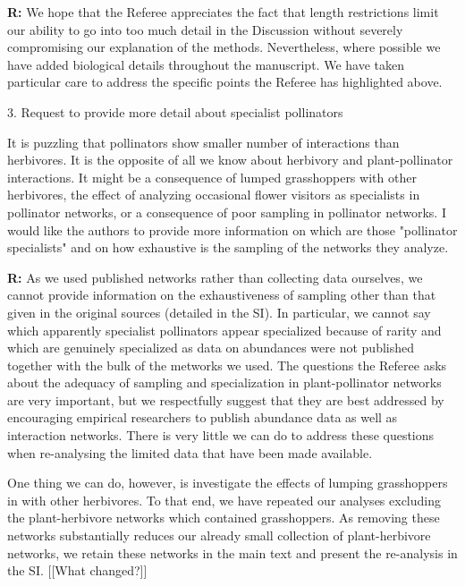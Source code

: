 \documentclass[12pt]{letter}
\newenvironment{refquote}{\bigskip \begin{it}}{\end{it}\smallskip}
\begin{document}
    \textbf{R:} We hope that the Referee appreciates the fact that length restrictions limit our ability to go into too much detail in the Discussion without severely compromising our explanation of the methods. Nevertheless, where possible we have added biological details throughout the manuscript. We have taken particular care to address the specific points the Referee has highlighted above.


  3. Request to provide more detail about specialist pollinators

    \begin{refquote}

      It is puzzling that pollinators show smaller number of interactions than herbivores. It is the opposite of all we know about herbivory and plant-pollinator interactions. It might be a consequence of lumped grasshoppers with other herbivores, the effect of analyzing occasional flower visitors as specialists in pollinator networks, or a consequence of poor sampling in pollinator networks. I would like the authors to provide more information on which are those "pollinator specialists" and on how exhaustive is the sampling of the networks they analyze.

    \end{refquote}

    \textbf{R:} As we used published networks rather than collecting data ourselves, we cannot provide information on the exhaustiveness of sampling other than that given in the original sources (detailed in the SI). In particular, we cannot say which apparently specialist pollinators appear specialized because of rarity and which are genuinely specialized as data on abundances were not published together with the bulk of the metworks we used. The questions the Referee asks about the adequacy of sampling and specialization in plant-pollinator networks are very important, but we respectfully suggest that they are best addressed by encouraging empirical researchers to publish abundance data as well as interaction networks. There is very little we can do to address these questions when re-analysing the limited data that have been made available.

   One thing we can do, however, is investigate the effects of lumping grasshoppers in with other herbivores. To that end, we have repeated our analyses excluding the plant-herbivore networks which contained grasshoppers. As removing these networks substantially reduces our already small collection of plant-herbivore networks, we retain these networks in the main text and present the re-analysis in the SI. [[What changed?]]
\end{document}
